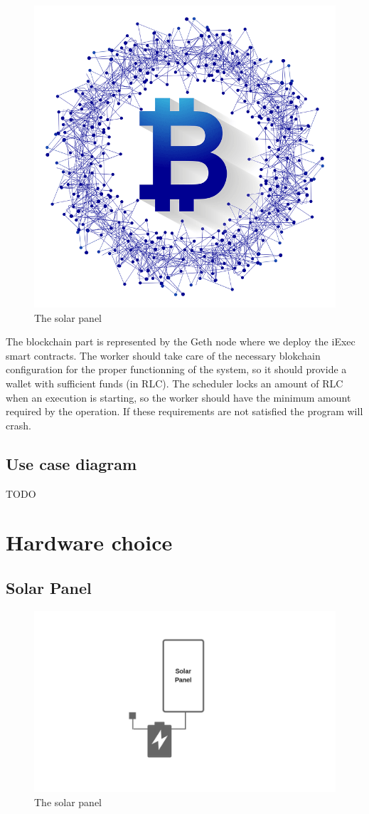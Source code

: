         \begin{figure}[!h]\centering
            \includegraphics[width=.3\columnwidth]{5-Design/figs/blockchain-logo.png}
            \caption{The solar panel}
        \end{figure}

        The blockchain part is represented by the Geth node where we deploy the iExec smart contracts.
        The worker should take care of the necessary blokchain configuration for the proper functionning
        of the system, so it should provide a wallet with sufficient funds (in RLC). The scheduler locks
        an amount of RLC when an execution is starting, so the worker should have the minimum amount
        required by the operation. If these requirements are not satisfied the program will crash.

    \subsection{Use case diagram}
    TODO


\section{Hardware choice}

    \subsection{Solar Panel}

        \begin{figure}[!h]\centering
            \includegraphics[width=.6\columnwidth]{5-Design/figs/solar-panel.png}
            \caption{The solar panel}
        \end{figure}

